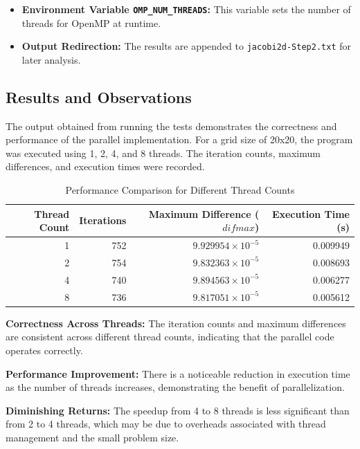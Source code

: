 \documentclass{article}
\begin{document}
    \begin{itemize}
        \item \textbf{Environment Variable \texttt{OMP\_NUM\_THREADS}:} This variable sets the number of threads for OpenMP at runtime.
        \item \textbf{Output Redirection:} The results are appended to \texttt{jacobi2d-Step2.txt} for later analysis.
    \end{itemize}


\subsection{Results and Observations}

The output obtained from running the tests demonstrates the correctness and performance of the parallel implementation. For a grid size of 20x20, the program was executed using 1, 2, 4, and 8 threads. The iteration counts, maximum differences, and execution times were recorded.

\begin{table}[H]
    \centering
    \caption{Performance Comparison for Different Thread Counts}
    \label{tab:performance_comparison}
    \begin{tabular}{rrrr}
    \toprule
    \textbf{Thread Count} & \textbf{Iterations} & \textbf{Maximum Difference ($difmax$)} & \textbf{Execution Time (s)} \\
    \midrule
    1 & 752 & $9.929954 \times 10^{-5}$ & 0.009949 \\
    2 & 754 & $9.832363 \times 10^{-5}$ & 0.008693 \\
    4 & 740 & $9.894563 \times 10^{-5}$ & 0.006277 \\
    8 & 736 & $9.817051 \times 10^{-5}$ & 0.005612 \\
    \bottomrule
    \end{tabular}
\end{table}


\textbf{Correctness Across Threads:} The iteration counts and maximum differences are consistent across different thread counts, indicating that the parallel code operates correctly.

\textbf{Performance Improvement:} There is a noticeable reduction in execution time as the number of threads increases, demonstrating the benefit of parallelization.

\textbf{Diminishing Returns:} The speedup from 4 to 8 threads is less significant than from 2 to 4 threads, which may be due to overheads associated with thread management and the small problem size.
\end{document}

